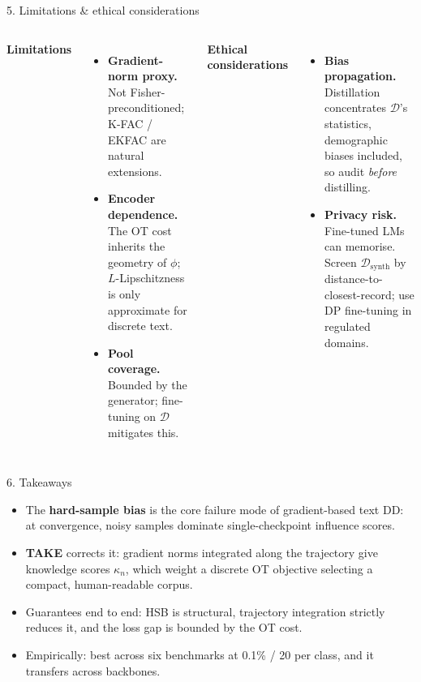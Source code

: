 \documentclass[aspectratio=169,11pt]{beamer}
\newcommand{\Dtrain}{\mathcal{D}}
\newcommand{\Dsyn}{\mathcal{D}_\text{synth}}
\begin{document}
\begin{frame}{5. Limitations \& ethical considerations}
  \small
  \begin{columns}[T,onlytextwidth]
      \textbf{Limitations}\par\medskip
      \begin{itemize}
        \item \textbf{Gradient-norm proxy.} Not Fisher-preconditioned; K-FAC / EKFAC are natural extensions.
        \item \textbf{Encoder dependence.} The OT cost inherits the geometry of $\phi$; $L$-Lipschitzness is only approximate for discrete text.
        \item \textbf{Pool coverage.} Bounded by the generator; fine-tuning on $\Dtrain$ mitigates this.
      \end{itemize}
      \textbf{Ethical considerations}\par\medskip
      \begin{itemize}
        \item \textbf{Bias propagation.} Distillation concentrates $\Dtrain$'s statistics, demographic biases included, so audit \emph{before} distilling.
        \item \textbf{Privacy risk.} Fine-tuned LMs can memorise. Screen $\Dsyn$ by distance-to-closest-record; use DP fine-tuning in regulated domains.
      \end{itemize}
  \end{columns}
\end{frame}

\begin{frame}{6. Takeaways}
  \begin{itemize}
    \item The \textbf{hard-sample bias} is the core failure mode of gradient-based text DD: at convergence, noisy samples dominate single-checkpoint influence scores.
    \medskip
    \item \textbf{TAKE} corrects it: gradient norms integrated along the trajectory give knowledge scores $\kappa_n$, which weight a discrete OT objective selecting a compact, human-readable corpus.
    \medskip
    \item Guarantees end to end: HSB is structural, trajectory integration strictly reduces it, and the loss gap is bounded by the OT cost.
    \medskip
    \item Empirically: best across six benchmarks at 0.1\% / 20 per class, and it transfers across backbones.
  \end{itemize}
\end{frame}
\end{document}
